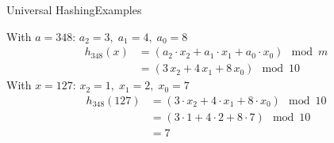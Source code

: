 
\begin{frame}{Universal Hashing}{Examples}
  \begin{example}[{\color{Mittel-Blau}%
    $\mathbb{U} = \{0, \dots, 999\}, \; m = 10, \; a = 348$}
  ]%
    With {\color{Mittel-Blau}$a=348$: $a_2 = 3, \; a_1 = 4, \; a_0 = 8$}
    {\color{Mittel-Blau}
    \begin{align*}
      h_{348}(x) &= (a_2 \cdot x_2 + a_1 \cdot x_1 + a_0 \cdot x_0) \mod m\\
      {} &= (3 \, x_2 + 4 \, x_1 + 8 \, x_0) \mod 10
    \end{align*}}
    With {\color{Mittel-Blau}$x = 127$: $x_2 = 1, \; x_1 = 2, \; x_0 = 7$}
    {\color{Mittel-Blau}
    \begin{align*}
      h_{348}(127) &= (3 \cdot x_2 + 4 \cdot x_1 + 8 \cdot x_0) \mod 10\\
      {} &= (3 \cdot 1 + 4 \cdot 2 + 8 \cdot 7) \mod 10\\
      {} &= 7
    \end{align*}}
  \end{example}
\end{frame}
